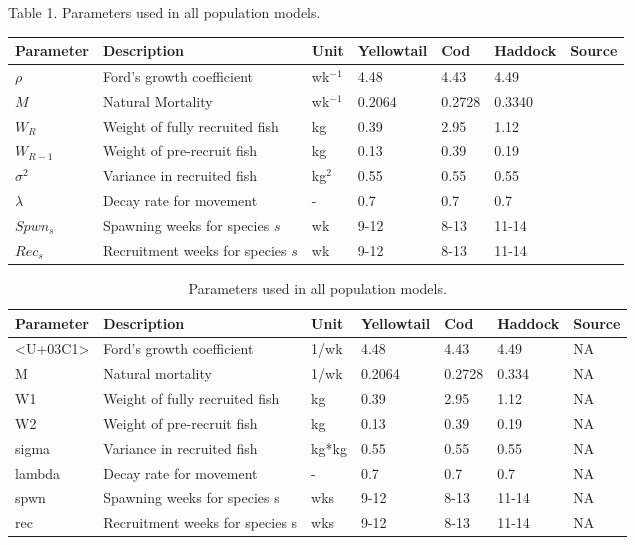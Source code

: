 \documentclass[
]{article}
\begin{document}
\pagebreak

Table 1. Parameters used in all population models.

\begin{longtable}[]{@{}lllllll@{}}
\toprule
Parameter & Description & Unit & Yellowtail & Cod & Haddock & Source \\
\midrule
\endhead
\(\rho\) & Ford's growth coefficient & wk\(^{-1}\) & 4.48 & 4.43 & 4.49 & \\
\(M\) & Natural Mortality & wk\(^{-1}\) & 0.2064 & 0.2728 & 0.3340 & \\
\(W_R\) & Weight of fully recruited fish & kg & 0.39 & 2.95 & 1.12 & \\
\(W_{R-1}\) & Weight of pre-recruit fish & kg & 0.13 & 0.39 & 0.19 & \\
\(\sigma^2\) & Variance in recruited fish & kg\(^2\) & 0.55 & 0.55 & 0.55 & \\
\(\lambda\) & Decay rate for movement & - & 0.7 & 0.7 & 0.7 & \\
\(Spwn_s\) & Spawning weeks for species \(s\) & wk & 9-12 & 8-13 & 11-14 & \\
\(Rec_s\) & Recruitment weeks for species \(s\) & wk & 9-12 & 8-13 & 11-14 & \\
\bottomrule
\end{longtable}

\begin{table}
 
 \caption{\label{tab:paramsALL2}Parameters used in all population models.}
 \centering
 \fontsize{10}{12}\selectfont
 \begin{tabular}[t]{lllllll}
 \toprule
 Parameter & Description & Unit & Yellowtail & Cod & Haddock & Source\\
 \midrule
 <U+03C1> & Ford's growth coefficient & 1/wk & 4.48 & 4.43 & 4.49 & NA\\
 M & Natural mortality & 1/wk & 0.2064 & 0.2728 & 0.334 & NA\\
 W1 & Weight of fully recruited fish & kg & 0.39 & 2.95 & 1.12 & NA\\
 W2 & Weight of pre-recruit fish & kg & 0.13 & 0.39 & 0.19 & NA\\
 sigma & Variance in recruited fish & kg*kg & 0.55 & 0.55 & 0.55 & NA\\
 \addlinespace
 lambda & Decay rate for movement & - & 0.7 & 0.7 & 0.7 & NA\\
 spwn & Spawning weeks for species s & wks & 9-12 & 8-13 & 11-14 & NA\\
 rec & Recruitment weeks for species s & wks & 9-12 & 8-13 & 11-14 & NA\\
 \bottomrule
 \end{tabular}
 \end{table}
\end{document}

